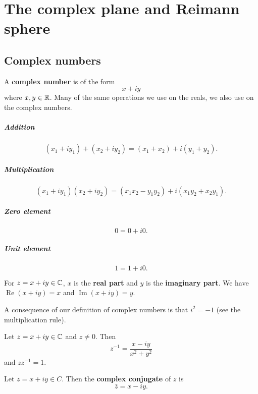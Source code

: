 \chapter{The complex plane and Reimann sphere}

\section{Complex numbers}

\begin{definition}
    A \textbf{complex number} is of the form \[ x + iy \] where $x, y \in \mathbb{R}$.
    Many of the same operations we use on the reals, we also use on the complex numbers.

    \paragraph{Addition} \[ (x_1 + iy_1) + (x_2 + iy_2) = (x_1 + x_2) + i(y_1 + y_2). \]

    \paragraph{Multiplication} \[ (x_1 + iy_1)(x_2 + iy_2) = (x_1x_2 - y_1y_2) + i(x_1y_2 + x_2y_1). \]

    \paragraph{Zero element} \[ 0 = 0 + i0. \]

    \paragraph{Unit element} \[ 1 = 1 + i0. \]

    For $z = x + iy \in \mathbb{C}$, $x$ is the \textbf{real part} and $y$ is the \textbf{imaginary part}. We have $\operatorname{Re}{(x+iy)} = x$ and $\operatorname{Im}{(x + iy)} = y$.
\end{definition}

A consequence of our definition of complex numbers is that $i^2 = -1$ (see the multiplication rule). 

\begin{definition}
    Let $z = x + iy \in \mathbb{C}$ and $z \neq 0$. Then \[ z^{-1} = \frac{x - iy}{x^2 + y^2} \] and $z z^{-1} = 1$.
\end{definition}

\begin{definition}
    Let $z = x + iy \in C$. Then the \textbf{complex conjugate} of $z$ is \[ \bar{z} = x - iy. \]
\end{definition}


